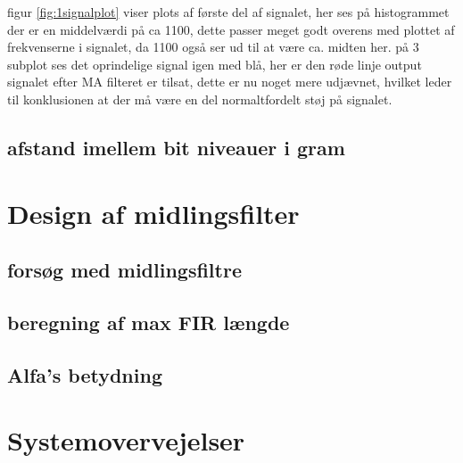 \documentclass{article}
\begin{document}
figur \ref{fig:1signalplot} viser plots af første del af signalet, her ses på histogrammet der er en middelværdi på ca 1100, dette passer meget godt overens med plottet af frekvenserne i signalet, da 1100 også ser ud til at være ca. midten her.
på 3 subplot ses det oprindelige signal igen med blå, her er den røde linje output signalet efter MA filteret er tilsat, dette er nu noget mere udjævnet, hvilket leder til konklusionen at der må være en del normaltfordelt støj på signalet.

\subsection{afstand imellem bit niveauer i gram}
\label{sec:afstand}

\section{Design af midlingsfilter}
\label{sec:Design}

\subsection{forsøg med midlingsfiltre}
\label{sec:forsøg}

\subsection{beregning af max FIR længde}
\label{sec:beregning}

\subsection{Alfa's betydning}
\label{sec:alfa}

\section{Systemovervejelser}
\label{sec:Systemovervejelser}
\end{document}
